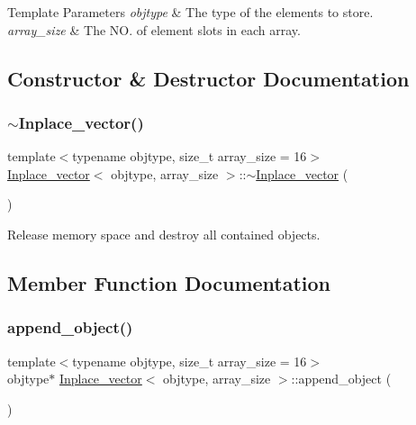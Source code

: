 \begin{DoxyTemplParams}{Template Parameters}
{\em objtype} & The type of the elements to store. \\
\hline
{\em array\+\_\+size} & The NO. of element slots in each array. \\
\hline
\end{DoxyTemplParams}


\subsection{Constructor \& Destructor Documentation}
\mbox{\label{classInplace__vector_a82912dffa04001608197c02d330e7cd1}} 
\subsubsection{\texorpdfstring{$\sim$\+Inplace\+\_\+vector()}{~Inplace\_vector()}}
{\footnotesize\ttfamily template$<$typename objtype, size\+\_\+t array\+\_\+size = 16$>$ \\
\mbox{\hyperlink{classInplace__vector}{Inplace\+\_\+vector}}$<$ objtype, array\+\_\+size $>$\+::$\sim$\mbox{\hyperlink{classInplace__vector}{Inplace\+\_\+vector}} (\begin{DoxyParamCaption}{ }\end{DoxyParamCaption})\hspace{0.3cm}{\ttfamily [inline]}}

Release memory space and destroy all contained objects. 

\subsection{Member Function Documentation}
\mbox{\label{classInplace__vector_af9b6fa9a44962ce82429772108446eb7}} 
\subsubsection{\texorpdfstring{append\+\_\+object()}{append\_object()}}
{\footnotesize\ttfamily template$<$typename objtype, size\+\_\+t array\+\_\+size = 16$>$ \\
objtype$\ast$ \mbox{\hyperlink{classInplace__vector}{Inplace\+\_\+vector}}$<$ objtype, array\+\_\+size $>$\+::append\+\_\+object (\begin{DoxyParamCaption}{ }\end{DoxyParamCaption})\hspace{0.3cm}{\ttfamily [inline]}}

